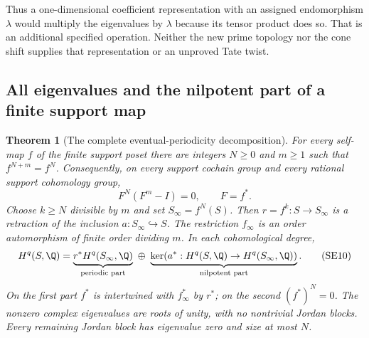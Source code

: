 \documentclass[11pt,a4paper]{article}
\newtheorem{theorem}{Theorem}[section]
\theoremstyle{definition}\newtheorem{definition}[theorem]{Definition}
\begin{document}
Thus a one-dimensional coefficient representation with an assigned
endomorphism $\lambda$ would multiply the eigenvalues by $\lambda$
because its tensor product does so. That is an additional specified
operation. Neither the new prime topology nor the cone shift supplies
that representation or an unproved Tate twist.

\subsection{All eigenvalues and the nilpotent part of a finite support map}

\begin{theorem}[The complete eventual-periodicity decomposition]
\label{thm:eventual-periodicity}
For every self-map $f$ of the finite support poset there are integers
$N\ge0$ and $m\ge1$ such that $f^{N+m}=f^N$. Consequently, on every
support cochain group and every rational support cohomology group,
\[
 F^N(F^m-I)=0,\qquad F=f^*.
 \tag{SE9}\label{eq:annihilating-polynomial}
\]
Choose $k\ge N$ divisible by $m$ and set $S_\infty=f^N(S)$.
Then $r=f^k:S\to S_\infty$ is a retraction of the inclusion
$a:S_\infty\hookrightarrow S$. The restriction $f_\infty$ is an
order automorphism of finite order dividing $m$. In each cohomological
degree,
\[
 H^q(S,\Q)=
 \underbrace{r^*H^q(S_\infty,\Q)}_{\text{periodic part}}
 \ \oplus\
 \underbrace{\ker(a^*:H^q(S,\Q)\to H^q(S_\infty,\Q))}_{\text{nilpotent part}}.
 \tag{SE10}\label{eq:periodic-decomposition}
\]
On the first part $f^*$ is intertwined with $f_\infty^*$ by $r^*$;
on the second $(f^*)^N=0$. The nonzero complex eigenvalues are roots
of unity, with no nontrivial Jordan blocks. Every remaining Jordan
block has eigenvalue zero and size at most $N$.
\end{theorem}
\end{document}
